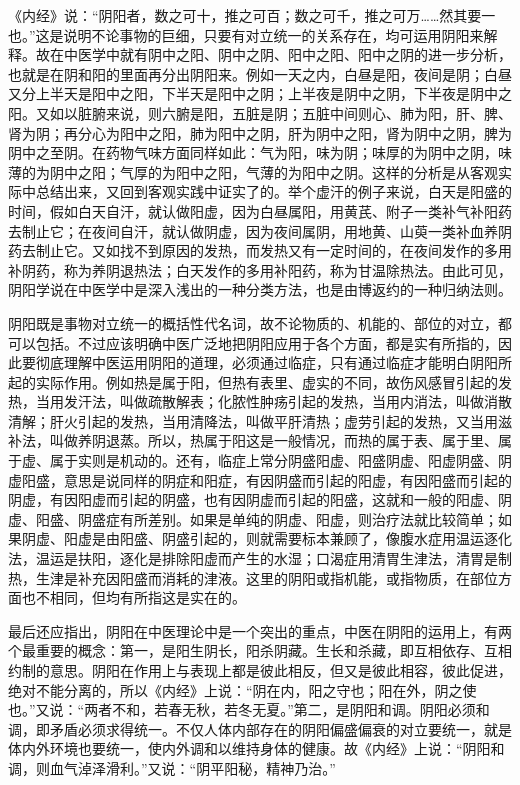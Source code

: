 \documentclass[12pt,UTF8]{ctexbook}
\begin{document}
《内经》说：“阴阳者，数之可十，推之可百；数之可千，推之可万……然其要一也。”这是说明不论事物的巨细，只要有对立统一的关系存在，均可运用阴阳来解释。故在中医学中就有阴中之阳、阴中之阴、阳中之阳、阳中之阴的进一步分析，也就是在阴和阳的里面再分出阴阳来。例如一天之内，白昼是阳，夜间是阴；白昼又分上半天是阳中之阳，下半天是阳中之阴；上半夜是阴中之阴，下半夜是阴中之阳。又如以脏腑来说，则六腑是阳，五脏是阴；五脏中间则心、肺为阳，肝、脾、肾为阴；再分心为阳中之阳，肺为阳中之阴，肝为阴中之阳，肾为阴中之阴，脾为阴中之至阴。在药物气味方面同样如此：气为阳，味为阴；味厚的为阴中之阴，味薄的为阴中之阳；气厚的为阳中之阳，气薄的为阳中之阴。这样的分析是从客观实际中总结出来，又回到客观实践中证实了的。举个虚汗的例子来说，白天是阳盛的时间，假如白天自汗，就认做阳虚，因为白昼属阳，用黄芪、附子一类补气补阳药去制止它；在夜间自汗，就认做阴虚，因为夜间属阴，用地黄、山萸一类补血养阴药去制止它。又如找不到原因的发热，而发热又有一定时间的，在夜间发作的多用补阴药，称为养阴退热法；白天发作的多用补阳药，称为甘温除热法。由此可见，阴阳学说在中医学中是深入浅出的一种分类方法，也是由博返约的一种归纳法则。

阴阳既是事物对立统一的概括性代名词，故不论物质的、机能的、部位的对立，都可以包括。不过应该明确中医广泛地把阴阳应用于各个方面，都是实有所指的，因此要彻底理解中医运用阴阳的道理，必须通过临症，只有通过临症才能明白阴阳所起的实际作用。例如热是属于阳，但热有表里、虚实的不同，故伤风感冒引起的发热，当用发汗法，叫做疏散解表；化脓性肿疡引起的发热，当用内消法，叫做消散清解；肝火引起的发热，当用清降法，叫做平肝清热；虚劳引起的发热，又当用滋补法，叫做养阴退蒸。所以，热属于阳这是一般情况，而热的属于表、属于里、属于虚、属于实则是机动的。还有，临症上常分阴盛阳虚、阳盛阴虚、阳虚阴盛、阴虚阳盛，意思是说同样的阴症和阳症，有因阴盛而引起的阳虚，有因阳盛而引起的阴虚，有因阳虚而引起的阴盛，也有因阴虚而引起的阳盛，这就和一般的阳虚、阴虚、阳盛、阴盛症有所差别。如果是单纯的阴虚、阳虚，则治疗法就比较简单；如果阴虚、阳虚是由阳盛、阴盛引起的，则就需要标本兼顾了，像腹水症用温运逐化法，温运是扶阳，逐化是排除阳虚而产生的水湿；口渴症用清胃生津法，清胃是制热，生津是补充因阳盛而消耗的津液。这里的阴阳或指机能，或指物质，在部位方面也不相同，但均有所指这是实在的。

最后还应指出，阴阳在中医理论中是一个突出的重点，中医在阴阳的运用上，有两个最重要的概念：第一，是阳生阴长，阳杀阴藏。生长和杀藏，即互相依存、互相约制的意思。阴阳在作用上与表现上都是彼此相反，但又是彼此相容，彼此促进，绝对不能分离的，所以《内经》上说：“阴在内，阳之守也；阳在外，阴之使也。”又说：“两者不和，若春无秋，若冬无夏。”第二，是阴阳和调。阴阳必须和调，即矛盾必须求得统一。不仅人体内部存在的阴阳偏盛偏衰的对立要统一，就是体内外环境也要统一，使内外调和以维持身体的健康。故《内经》上说：“阴阳和调，则血气淖泽滑利。”又说：“阴平阳秘，精神乃治。”
\end{document}

